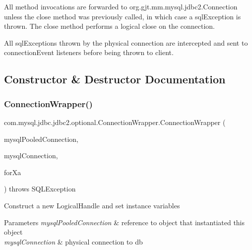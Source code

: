 All method invocations are forwarded to org.\+gjt.\+mm.\+mysql.\+jdbc2.\+Connection unless the close method was previously called, in which case a sql\+Exception is thrown. The close method performs a \textquotesingle{}logical close\textquotesingle{} on the connection.

All sql\+Exceptions thrown by the physical connection are intercepted and sent to connection\+Event listeners before being thrown to client. 

\subsection{Constructor \& Destructor Documentation}
\mbox{\label{classcom_1_1mysql_1_1jdbc_1_1jdbc2_1_1optional_1_1_connection_wrapper_a4300303d3f60a9a817eb9db03d583034}} 
\subsubsection{\texorpdfstring{Connection\+Wrapper()}{ConnectionWrapper()}}
{\footnotesize\ttfamily com.\+mysql.\+jdbc.\+jdbc2.\+optional.\+Connection\+Wrapper.\+Connection\+Wrapper (\begin{DoxyParamCaption}\item[{\mbox{\hyperlink{classcom_1_1mysql_1_1jdbc_1_1jdbc2_1_1optional_1_1_mysql_pooled_connection}{Mysql\+Pooled\+Connection}}}]{mysql\+Pooled\+Connection,  }\item[{\mbox{\hyperlink{interfacecom_1_1mysql_1_1jdbc_1_1_connection}{Connection}}}]{mysql\+Connection,  }\item[{boolean}]{for\+Xa }\end{DoxyParamCaption}) throws S\+Q\+L\+Exception}

Construct a new Logical\+Handle and set instance variables


\begin{DoxyParams}{Parameters}
{\em mysql\+Pooled\+Connection} & reference to object that instantiated this object \\
\hline
{\em mysql\+Connection} & physical connection to db\\
\hline
\end{DoxyParams}


